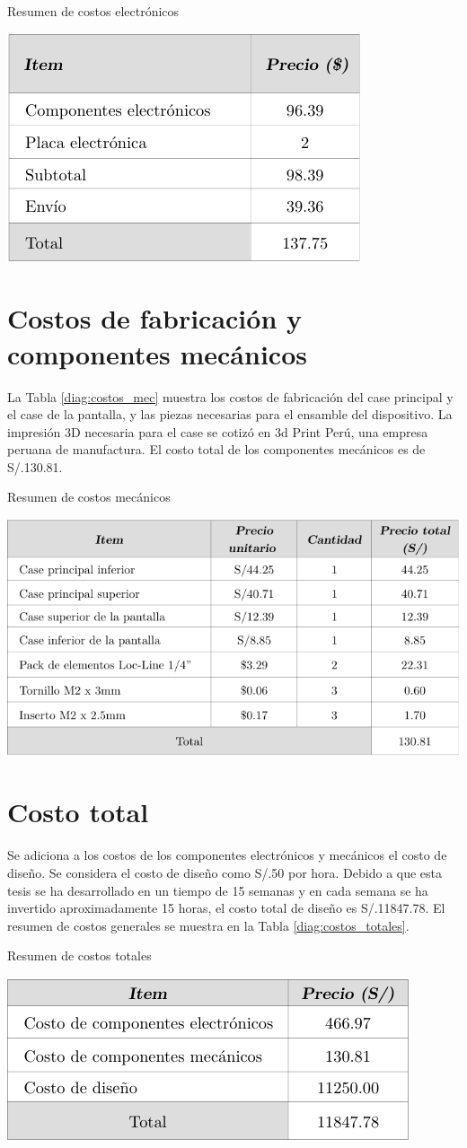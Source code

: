 \begin{table}[htb!]
  \caption{Resumen de costos electrónicos}
  \label{diag:costos_elec}
  \centering
  \includegraphics[width=0.55\linewidth]{costos_elec.pdf}
\end{table}


\section{Costos de fabricación y componentes mecánicos}
La Tabla \ref{diag:costos_mec} muestra los costos de fabricación del case principal y el case de la pantalla, y las piezas necesarias para el ensamble del dispositivo. La impresión 3D necesaria para el case se cotizó en 3d Print Perú, una empresa peruana de manufactura. El costo total de los componentes mecánicos es de S/.130.81.

\begin{table}[htb!]
  \caption{Resumen de costos mecánicos}
  \label{diag:costos_mec}
  \centering
  \includegraphics[width=0.9\linewidth]{costos_mec.pdf}
\end{table}

\vspace{-5mm}

\section{Costo total}
Se adiciona a los costos de los componentes electrónicos y mecánicos el costo de diseño. Se considera el costo de diseño como S/.50 por hora. Debido a que esta tesis se ha desarrollado en un tiempo de 15 semanas y en cada semana se ha invertido aproximadamente 15 horas, el costo total de diseño es S/.11847.78. El resumen de costos generales se muestra en la Tabla \ref{diag:costos_totales}.

\begin{table}[H]
  \caption{Resumen de costos totales}
  \label{diag:costos_totales}
  \centering
  \includegraphics[width=0.6\linewidth]{costos_totales.pdf}
\end{table}
